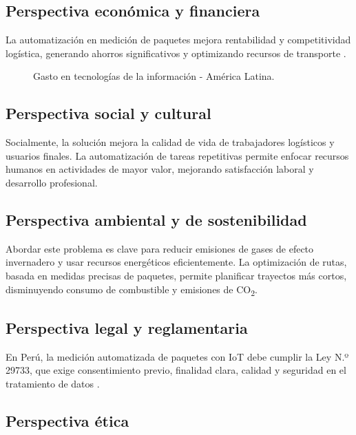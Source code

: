 \subsection{Perspectiva económica y financiera}

La automatización en medición de paquetes mejora rentabilidad y competitividad logística, generando ahorros significativos y optimizando recursos de transporte \cite{Krysiska2024}.

\begin{figure}[H]
    \centering
    \caption{Gasto en tecnologías de la información - América Latina.}
    \label{fig:gastos_tecnologia}
\end{figure}

\subsection{Perspectiva social y cultural}

Socialmente, la solución mejora la calidad de vida de trabajadores logísticos y usuarios finales. La automatización de tareas repetitivas permite enfocar recursos humanos en actividades de mayor valor, mejorando satisfacción laboral y desarrollo profesional.

\subsection{Perspectiva ambiental y de sostenibilidad}
Abordar este problema es clave para reducir emisiones de gases de efecto invernadero y usar recursos energéticos eficientemente. La optimización de rutas, basada en medidas precisas de paquetes, permite planificar trayectos más cortos, disminuyendo consumo de combustible y emisiones de CO\textsubscript{2}.

\subsection{Perspectiva legal y reglamentaria}

En Perú, la medición automatizada de paquetes con IoT debe cumplir la Ley N.º 29733, que exige consentimiento previo, finalidad clara, calidad y seguridad en el tratamiento de datos \cite{EditoraPer2973}.

\subsection{Perspectiva ética}

